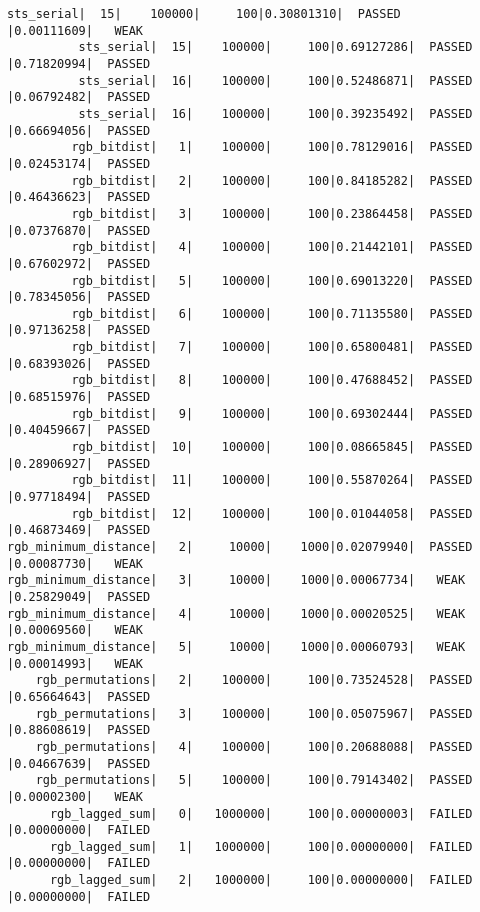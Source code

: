 \documentclass[a4paper]{article}
\begin{document}
\begin{Verbatim}[fontsize=\tiny]
          sts_serial|  15|    100000|     100|0.30801310|  PASSED          |0.00111609|   WEAK   
          sts_serial|  15|    100000|     100|0.69127286|  PASSED          |0.71820994|  PASSED  
          sts_serial|  16|    100000|     100|0.52486871|  PASSED          |0.06792482|  PASSED  
          sts_serial|  16|    100000|     100|0.39235492|  PASSED          |0.66694056|  PASSED  
         rgb_bitdist|   1|    100000|     100|0.78129016|  PASSED          |0.02453174|  PASSED  
         rgb_bitdist|   2|    100000|     100|0.84185282|  PASSED          |0.46436623|  PASSED  
         rgb_bitdist|   3|    100000|     100|0.23864458|  PASSED          |0.07376870|  PASSED  
         rgb_bitdist|   4|    100000|     100|0.21442101|  PASSED          |0.67602972|  PASSED  
         rgb_bitdist|   5|    100000|     100|0.69013220|  PASSED          |0.78345056|  PASSED  
         rgb_bitdist|   6|    100000|     100|0.71135580|  PASSED          |0.97136258|  PASSED  
         rgb_bitdist|   7|    100000|     100|0.65800481|  PASSED          |0.68393026|  PASSED  
         rgb_bitdist|   8|    100000|     100|0.47688452|  PASSED          |0.68515976|  PASSED  
         rgb_bitdist|   9|    100000|     100|0.69302444|  PASSED          |0.40459667|  PASSED  
         rgb_bitdist|  10|    100000|     100|0.08665845|  PASSED          |0.28906927|  PASSED  
         rgb_bitdist|  11|    100000|     100|0.55870264|  PASSED          |0.97718494|  PASSED  
         rgb_bitdist|  12|    100000|     100|0.01044058|  PASSED          |0.46873469|  PASSED  
rgb_minimum_distance|   2|     10000|    1000|0.02079940|  PASSED          |0.00087730|   WEAK   
rgb_minimum_distance|   3|     10000|    1000|0.00067734|   WEAK           |0.25829049|  PASSED  
rgb_minimum_distance|   4|     10000|    1000|0.00020525|   WEAK           |0.00069560|   WEAK   
rgb_minimum_distance|   5|     10000|    1000|0.00060793|   WEAK           |0.00014993|   WEAK   
    rgb_permutations|   2|    100000|     100|0.73524528|  PASSED          |0.65664643|  PASSED  
    rgb_permutations|   3|    100000|     100|0.05075967|  PASSED          |0.88608619|  PASSED  
    rgb_permutations|   4|    100000|     100|0.20688088|  PASSED          |0.04667639|  PASSED  
    rgb_permutations|   5|    100000|     100|0.79143402|  PASSED          |0.00002300|   WEAK   
      rgb_lagged_sum|   0|   1000000|     100|0.00000003|  FAILED          |0.00000000|  FAILED  
      rgb_lagged_sum|   1|   1000000|     100|0.00000000|  FAILED          |0.00000000|  FAILED  
      rgb_lagged_sum|   2|   1000000|     100|0.00000000|  FAILED          |0.00000000|  FAILED  

\end{Verbatim}
\end{document}
